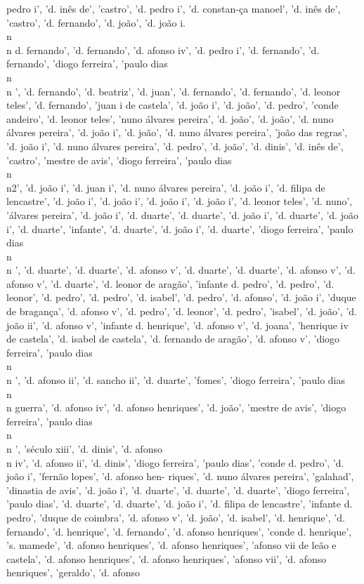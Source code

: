 \documentclass{article}
\begin{document}
\begin{itemize}
pedro i', 'd. inês de', 'castro', 'd. pedro i', 'd. constan-ça manoel', 'd. inês de', 'castro', 'd. fernando', 'd. joão', 'd. joão i.\\n\\n d. fernando', 'd. fernando', 'd. afonso iv', 'd. pedro i', 'd. fernando', 'd. fernando', 'diogo ferreira', 'paulo dias\\n\\n ', 'd. fernando', 'd. beatriz', 'd. juan', 'd. fernando', 'd. fernando', 'd. leonor teles', 'd. fernando', 'juan i de castela', 'd. joão i', 'd. joão', 'd. pedro', 'conde andeiro', 'd. leonor teles', 'nuno álvares pereira', 'd. joão', 'd. joão', 'd. nuno álvares pereira', 'd. joão i', 'd. joão', 'd. nuno álvares pereira', 'joão das regras', 'd. joão i', 'd. nuno álvares pereira', 'd. pedro', 'd. joão', 'd. dinis', 'd. inês de', 'castro', 'mestre de avis', 'diogo ferreira', 'paulo dias\\n\\n2', 'd. joão i', 'd. juan i', 'd. nuno álvares pereira', 'd. joão i', 'd. filipa de lencastre', 'd. joão i', 'd. joão i', 'd. joão i', 'd. joão i', 'd. leonor teles', 'd. nuno', 'álvares pereira', 'd. joão i', 'd. duarte', 'd. duarte', 'd. joão i', 'd. duarte', 'd. joão i', 'd. duarte', 'infante', 'd. duarte', 'd. joão i', 'd. duarte', 'diogo ferreira', 'paulo dias\\n\\n ', 'd. duarte', 'd. duarte', 'd. afonso v', 'd. duarte', 'd. duarte', 'd. afonso v', 'd. afonso v', 'd. duarte', 'd. leonor de aragão', 'infante d. pedro', 'd. pedro', 'd. leonor', 'd. pedro', 'd. pedro', 'd. isabel', 'd. pedro', 'd. afonso', 'd. joão i', 'duque de bragança', 'd. afonso v', 'd. pedro', 'd. leonor', 'd. pedro', 'isabel', 'd. joão', 'd. joão ii', 'd. afonso v', 'infante d. henrique', 'd. afonso v', 'd. joana', 'henrique iv de castela', 'd. isabel de castela', 'd. fernando de aragão', 'd. afonso v', 'diogo ferreira', 'paulo dias\\n\\n ', 'd. afonso ii', 'd. sancho ii', 'd. duarte', 'fomes', 'diogo ferreira', 'paulo dias\\n\\n guerra', 'd. afonso iv', 'd. afonso henriques', 'd. joão', 'mestre de avis', 'diogo ferreira', 'paulo dias\\n\\n ', 'século xiii', 'd. dinis', 'd. afonso\\n iv', 'd. afonso ii', 'd. dinis', 'diogo ferreira', 'paulo dias', 'conde d. pedro', 'd. joão i', 'fernão lopes', 'd. afonso hen- riques', 'd. nuno álvares pereira', 'galahad', 'dinastia de avis', 'd. joão i', 'd. duarte', 'd. duarte', 'd. duarte', 'diogo ferreira', 'paulo dias', 'd. duarte', 'd. duarte', 'd. joão i', 'd. filipa de lencastre', 'infante d. pedro', 'duque de coimbra', 'd. afonso v', 'd. joão', 'd. isabel', 'd. henrique', 'd. fernando', 'd. henrique', 'd. fernando', 'd. afonso henriques', 'conde d. henrique', 's. mamede', 'd. afonso henriques', 'd. afonso henriques', 'afonso vii de leão e castela', 'd. afonso henriques', 'd. afonso henriques', 'afonso vii', 'd. afonso henriques', 'geraldo', 'd. afonso 
\end{itemize}
\end{document}
